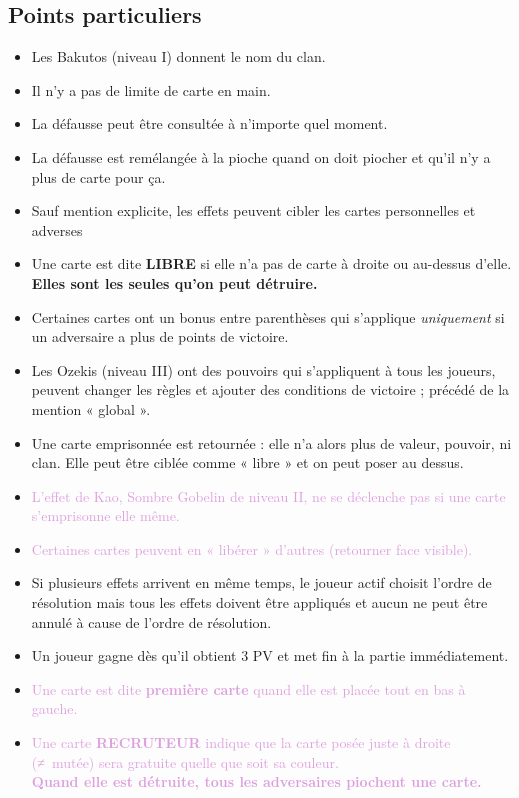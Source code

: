 \documentclass[10pt, a4paper]{article}	%
\begin{document}
\begin{multicols}{3}
\section{Points particuliers}
\label{sec:points_particuliers}
\begin{itemize}
	\item Les Bakutos (niveau I) donnent le nom du clan.
	\item Il n'y a pas de limite de carte en main.
	\item La défausse peut être consultée à n'importe quel moment.
	\item La défausse est remélangée à la pioche quand on doit piocher et qu'il n'y a plus de carte pour ça.
	\item Sauf mention explicite, les effets peuvent cibler les cartes personnelles et adverses
	\item Une carte est dite \textbf{LIBRE} si elle n'a pas de carte à droite ou au-dessus d'elle. \\ \textbf{Elles sont les seules qu'on peut détruire.}
	\item Certaines cartes ont un bonus entre parenthèses qui s'applique \textit{uniquement} si un adversaire a plus de points de victoire.
	\item Les Ozekis (niveau III) ont des pouvoirs qui s'appliquent à tous les joueurs, peuvent changer les règles et ajouter des conditions de victoire ; précédé de la mention « global ».
	\item Une carte emprisonnée est retournée : elle n'a alors plus de valeur, pouvoir, ni clan. Elle peut être ciblée comme « libre » et on peut poser au dessus.
	\item \textcolor{Plum}{L’effet de Kao, Sombre Gobelin de niveau II, ne se déclenche pas si une carte s’emprisonne elle même.}
	\item \textcolor{Plum}{Certaines cartes peuvent en « libérer » d’autres (retourner face visible).}
	\item Si plusieurs effets arrivent en même temps, le joueur actif choisit l'ordre de résolution mais tous les effets doivent être appliqués et aucun ne peut être annulé à cause de l'ordre de résolution.
	\item Un joueur gagne dès qu'il obtient 3 PV et met fin à la partie immédiatement.
	\item \textcolor{Plum}{Une carte est dite \textbf{première carte} quand elle est placée tout en bas à gauche.}
	\item \textcolor{Plum}{Une carte \textbf{RECRUTEUR} indique que la carte posée juste à droite (≠ mutée) sera gratuite quelle que soit sa couleur.\\ \textbf{Quand elle est détruite, tous les adversaires piochent une carte.}}

\end{itemize}
\end{multicols}
\end{document}
